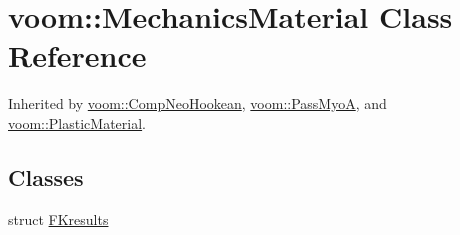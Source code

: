 \hypertarget{classvoom_1_1_mechanics_material}{
\section{voom::MechanicsMaterial Class Reference}
\label{classvoom_1_1_mechanics_material}
}


Inherited by \hyperlink{classvoom_1_1_comp_neo_hookean}{voom::CompNeoHookean}, \hyperlink{classvoom_1_1_pass_myo_a}{voom::PassMyoA}, and \hyperlink{classvoom_1_1_plastic_material}{voom::PlasticMaterial}.\subsection*{Classes}
\begin{DoxyCompactItemize}
\item 
struct \hyperlink{structvoom_1_1_mechanics_material_1_1_f_kresults}{FKresults}
\end{DoxyCompactItemize}
